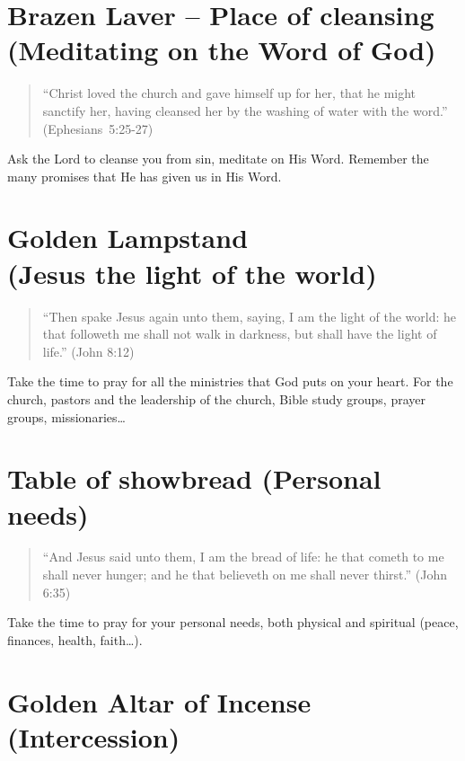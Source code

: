 \section{Brazen Laver – Place of cleansing (Meditating on the Word of God)}


\begin{quote}
``Christ loved the church and gave himself up for her, that he might sanctify her,
    having cleansed her by the washing of water with the word.''  (Ephesians~5:25-27)
\end{quote}

Ask the Lord to cleanse you from sin, meditate on His Word.
Remember the many promises that He has given us in His Word.



\section{Golden Lampstand\\(Jesus the light of the world)}


\begin{quote}
``Then spake Jesus again unto them, saying, I am the light of the world:
    he that followeth me shall not walk in darkness,
    but shall have the light of life.'' (John 8:12)
\end{quote}

Take the time to pray for all the ministries that God puts on your heart.
For the church, pastors and the leadership of the church, Bible study groups,
prayer groups, missionaries\ldots{}


\section{Table of showbread (Personal needs)}

\begin{quote}
``And Jesus said unto them, I am the bread of life:
    he that cometh to me shall never hunger;
    and he that believeth on me shall never thirst.'' (John 6:35)
\end{quote}

Take the time to pray for your personal needs,
both physical and spiritual (peace, finances, health, faith\ldots{}).


\section{Golden Altar of Incense\\(Intercession)}

